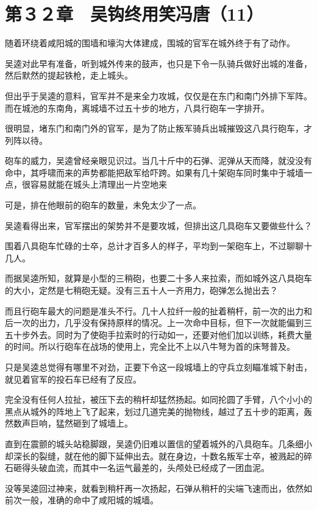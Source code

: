 \section{第３２章　吴钩终用笑冯唐（11）}

随着环绕着咸阳城的围墙和壕沟大体建成，围城的官军在城外终于有了动作。

吴逵对此早有准备，听到城外传来的鼓声，也只是下令一队骑兵做好出城的准备，然后默然的提起铁枪，走上城头。

但出乎于吴逵的意料，官军并不是来全力攻城，仅仅是在东门和南门外排下军阵。而在城池的东南角，离城墙不过五十步的地方，八具行砲车一字排开。

很明显，堵东门和南门外的官军，是为了防止叛军骑兵出城摧毁这八具行砲车，才列阵以待。

砲车的威力，吴逵曾经亲眼见识过。当几十斤中的石弹、泥弹从天而降，就没没有命中，其呼啸而来的声势都能把敌军给吓跨。如果有几十架砲车同时集中于城墙一点，很容易就能在城头上清理出一片空地来

可是，排在他眼前的砲车的数量，未免太少了一点。

吴逵看得出来，官军摆出的架势并不是要攻城，但排出这几具砲车又要做些什么？

围着八具砲车忙碌的士卒，总计才百多人的样子，平均到一架砲车上，不过聊聊十几人。

而据吴逵所知，就算是小型的三稍砲，也要二十多人来拉索，而如城外这八具砲车的大小，定然是七稍砲无疑。没有三五十人一齐用力，砲弹怎么抛出去？

而且行砲车最大的问题是准头不行。几十人拉纤一般的扯着稍杆，前一次的出力和后一次的出力，几乎没有保持原样的情况。上一次命中目标，但下一次就能偏到三五十步外去。同时为了使砲手拉索时的行动如一，还要对他们加以训练，耗费大量的时间。所以行砲车在战场的使用上，完全比不上以八牛弩为首的床弩普及。

只是吴逵总觉得有哪里不对劲，正要下令这一段城墙上的守兵立刻瞄准城下射击，就见着官军的投石车已经有了反应。

完全没有任何人拉扯，被压下去的稍杆却猛然扬起。如同抡圆了手臂，八个小小的黑点从城外的阵地上飞了起来，划过几道完美的抛物线，越过了五十步的距离，轰然数声巨响，猛然砸到了城墙上。

直到在震颤的城头站稳脚跟，吴逵仍旧难以置信的望着城外的八具砲车。几条细小却深长的裂缝，就在他的脚下延伸出去。就在身边，十数名叛军士卒，被溅起的碎石砸得头破血流，而其中一名运气最差的，头颅处已经成了一团血泥。

没等吴逵回过神来，就看到稍杆再一次扬起，石弹从稍杆的尖端飞速而出，依然如前次一般，准确的命中了咸阳城的城墙。

